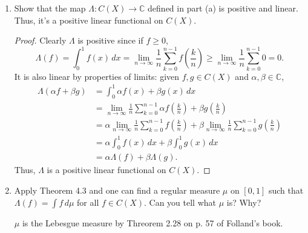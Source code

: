 \documentclass[11pt,oneside,english]{amsart}
\theoremstyle{definition}
\newcommand{\lom}[2]{\lim_{{#1}\rightarrow{#2}}}
\newcommand{\MB}[1]{\mathbb{#1}}
\begin{document}
\begin{enumerate}
\begin{enumerate}
\begin{proof}
Since $f$ is continuous on $[0,1]$, it is Lebesgue-integrable. Moreover, it is Riemann-integrable, and the set of points $\{x_k\}=\left\{0+\frac{k}{n}\mid0\leq k\leq n-1\right\}$ form a uniform partition of $[0,1]$ where $\Delta x=\frac{1-0}{n}=\frac{1}{n}$. Consequently,
\[
\lom{n}{\infty}\frac{1}{n}\sum_{k=0}^{n-1}f\left(\frac{k}{n}\right)=\lom{n}{\infty}\sum_{k=0}^{n-1}f\left(\frac{k}{n}\right)\cdot\frac{1}{n}=\lom{n}{\infty}\sum_{k=0}^{n-1}f(x_k)\Delta x=\int_0^1f(x)\,dx.
\]
Therefore, for any $f\in C(X)$, we can write
\[
\Lambda(f)=\int_0^1f(x)\,dx=\lom{n}{\infty}\frac{1}{n}\sum_{k=0}^{n-1}f\left(\frac{k}{n}\right).
\]
\end{proof}

\item Show that the map $\Lambda:C(X)\to\MB{C}$ defined in part (a) is positive and linear. Thus, it's a positive linear functional on $C(X)$.

\begin{proof}
Clearly $\Lambda$ is positive since if $f\geq0$,
\[
\Lambda(f)=\int_0^1f(x)\,dx=\lom{n}{\infty}\frac{1}{n}\sum_{k=0}^{n-1}f\left(\frac{k}{n}\right)\geq\lom{n}{\infty}\frac{1}{n}\sum_{k=0}^{n-1}0=0.
\]
It is also linear by properties of limits: given $f,g\in C(X)$ and $\alpha,\beta\in\MB{C}$,
\begin{align*}
\Lambda(\alpha f+\beta g)&=\int_0^1\alpha f(x)+\beta g(x)\,dx\\[2mm]
&=\lom{n}{\infty}\frac{1}{n}\sum_{k=0}^{n-1}\alpha f\left(\frac{k}{n}\right)+\beta g\left(\frac{k}{n}\right)\\[2mm]
&=\alpha \lom{n}{\infty}\frac{1}{n}\sum_{k=0}^{n-1}f\left(\frac{k}{n}\right)+\beta \lom{n}{\infty}\frac{1}{n}\sum_{k=0}^{n-1}g\left(\frac{k}{n}\right)\\[2mm]
&=\alpha\int_0^1f(x)\,dx+\beta\int_0^1g(x)\,dx\\[2mm]
&=\alpha\Lambda(f)+\beta\Lambda(g).
\end{align*}
Thus, $\Lambda$ is a positive linear functional on $C(X)$.
\end{proof}

\item Apply Theorem 4.3 and one can find a regular measure $\mu$ on $[0,1]$ such that $\Lambda(f)=\int f\,d\mu$ for all $f\in C(X)$. Can you tell what $\mu$ is? Why?

$\mu$ is the Lebesgue measure by Threorem 2.28 on p. 57 of Folland's book.
\end{enumerate}


\end{enumerate}
\end{document}
